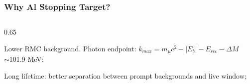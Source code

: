 \documentclass{beamer}
\begin{document}
\begin{frame}
    \frametitle{Why Al Stopping Target?}
    \vspace{-3mm}
\begin{columns}
 \begin{column}{0.65\framewidth}
 \setlength{\leftmargini}{1.1em}
 \vspace{-3mm}
    \begin{itemize}
   {\small     \item Lower RMC background. Photon endpoint: {\footnotesize $k_{max} = m_\mu c^2 - |E_b| - E_{rec} - \Delta M$ }
        \\
        $\sim$101.9 MeV; 
        \vspace{3mm}
\item Long lifetime: better separation between prompt backgrounds and live window; 

}
\end{itemize}
\end{column}
\end{columns}
\end{frame}
\end{document}
